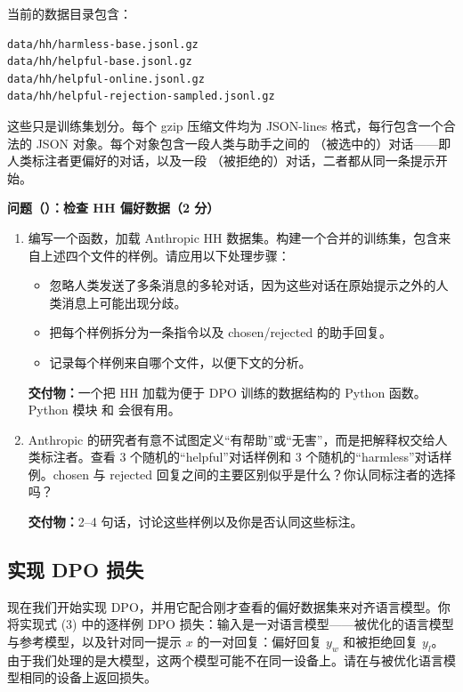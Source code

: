 当前的数据目录包含：

\begin{lstlisting}
data/hh/harmless-base.jsonl.gz
data/hh/helpful-base.jsonl.gz
data/hh/helpful-online.jsonl.gz
data/hh/helpful-rejection-sampled.jsonl.gz
\end{lstlisting}

这些只是训练集划分。每个 gzip 压缩文件均为 JSON-lines 格式，每行包含一个合法的 JSON 对象。每个对象包含一段人类与助手之间的 （被选中的）对话——即人类标注者更偏好的对话，以及一段 （被拒绝的）对话，二者都从同一条提示开始。

\medskip
\noindent\textbf{问题（）：检查 HH 偏好数据（2 分）}
\medskip

\begin{enumerate}[label=(\alph*)]
  \item 编写一个函数，加载 Anthropic HH 数据集。构建一个合并的训练集，包含来自上述四个文件的样例。请应用以下处理步骤：
  \begin{itemize}
    \item 忽略人类发送了多条消息的多轮对话，因为这些对话在原始提示之外的人类消息上可能出现分歧。
    \item 把每个样例拆分为一条指令以及 chosen/rejected 的助手回复。
    \item 记录每个样例来自哪个文件，以便下文的分析。
  \end{itemize}

  \textbf{交付物：}一个把 HH 加载为便于 DPO 训练的数据结构的 Python 函数。Python 模块  和  会很有用。
  \item Anthropic 的研究者有意不试图定义“有帮助”或“无害”，而是把解释权交给人类标注者。查看 3 个随机的“helpful”对话样例和 3 个随机的“harmless”对话样例。chosen 与 rejected 回复之间的主要区别似乎是什么？你认同标注者的选择吗？

  \textbf{交付物：}2--4 句话，讨论这些样例以及你是否认同这些标注。
\end{enumerate}

\subsection{实现 DPO 损失}

现在我们开始实现 DPO，并用它配合刚才查看的偏好数据集来对齐语言模型。你将实现式 (3) 中的逐样例 DPO 损失：输入是一对语言模型——被优化的语言模型与参考模型，以及针对同一提示 $x$ 的一对回复：偏好回复 $y_w$ 和被拒绝回复 $y_l$。由于我们处理的是大模型，这两个模型可能不在同一设备上。请在与被优化语言模型相同的设备上返回损失。

